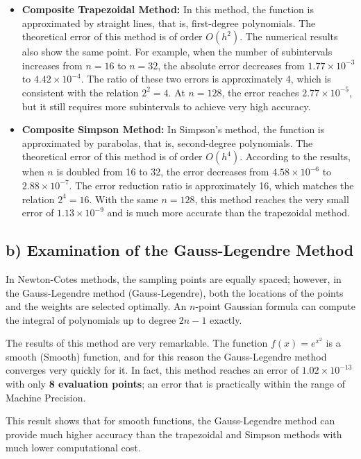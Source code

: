 \documentclass[12pt,a4paper]{article}
\begin{document}
	\begin{itemize}
		\item \textbf{Composite Trapezoidal Method:}
		In this method, the function is approximated by straight lines, that is, first-degree polynomials. The theoretical error of this method is of order
		$O(h^2)$.
		The numerical results also show the same point. For example, when the number of subintervals increases from
		$n=16$
		to
		$n=32$,
		the absolute error decreases from
		$1.77 \times 10^{-3}$
		to
		$4.42 \times 10^{-4}$.
		The ratio of these two errors is approximately 4, which is consistent with the relation
		$2^2=4$.
		At
		$n=128$,
		the error reaches
		$2.77 \times 10^{-5}$,
		but it still requires more subintervals to achieve very high accuracy.
		
		\item \textbf{Composite Simpson Method:}
		In Simpson's method, the function is approximated by parabolas, that is, second-degree polynomials. The theoretical error of this method is of order
		$O(h^4)$.
		According to the results, when
		$n$
		is doubled from 16 to 32, the error decreases from
		$4.58 \times 10^{-6}$
		to
		$2.88 \times 10^{-7}$.
		The error reduction ratio is approximately 16, which matches the relation
		$2^4=16$.
		With the same
		$n=128$,
		this method reaches the very small error of
		$1.13 \times 10^{-9}$
		and is much more accurate than the trapezoidal method.
	\end{itemize}
	
	\subsection*{b) Examination of the Gauss-Legendre Method}
	
	In Newton-Cotes methods, the sampling points are equally spaced; however, in the Gauss-Legendre method
	(Gauss-Legendre),
	both the locations of the points and the weights are selected optimally. An
	$n$-point
	Gaussian formula can compute the integral of polynomials up to degree
	$2n-1$
	exactly.
	
	The results of this method are very remarkable. The function
	$f(x)=e^{x^2}$
	is a smooth
	(Smooth)
	function, and for this reason the Gauss-Legendre method converges very quickly for it. In fact, this method reaches an error of
	$1.02 \times 10^{-13}$
	with only
	\textbf{8 evaluation points};
	an error that is practically within the range of
	Machine Precision.
	
	This result shows that for smooth functions, the Gauss-Legendre method can provide much higher accuracy than the trapezoidal and Simpson methods with much lower computational cost.
	
\end{document}
